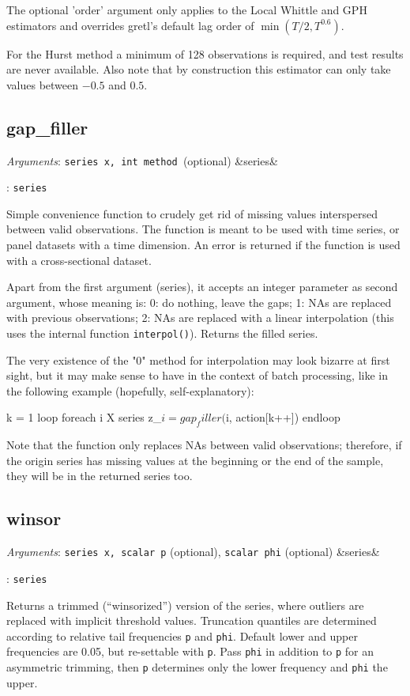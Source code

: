 \documentclass[11pt,english]{article}
\newcommand{\ArgRet}[2]{%
  {\it Arguments}: {#1}%
  \ifx&#2&%
  \else
  \par\smallskip\noindent {\it Return type}: \texttt{#2}
  \fi%
  \par\medskip\par%
  }
\begin{document}
The optional 'order' argument only applies to the Local Whittle and GPH
estimators and overrides gretl's default lag order of $\min(T/2, T^{0.6})$.

For the Hurst method a minimum of 128 observations is required, and test
results are never available. Also note that by construction this estimator can
only take values between $-0.5$ and $0.5$.

\subsection{gap\_filler}

\ArgRet{\texttt{series x, int method }(optional)}{series}

Simple convenience function to crudely get rid of missing values
interspersed between valid observations. The function is meant to be
used with time series, or panel datasets with a time dimension. An
error is returned if the function is used with a cross-sectional
dataset.

Apart from the first argument (series), it accepts an integer
parameter as second argument, whose meaning is: 0: do nothing, leave
the gaps; 1: NAs are replaced with previous observations; 2: NAs are
replaced with a linear interpolation (this uses the internal function
\texttt{interpol()}). Returns the filled series.

The very existence of the "0" method for interpolation may look
bizarre at first sight, but it may make sense to have in the context
of batch processing, like in the following example (hopefully,
self-explanatory):
\begin{code}
k = 1
loop foreach i X
   series z_$i = gap_filler($i, action[k++])
endloop
\end{code}

Note that the function only replaces NAs between valid observations;
therefore, if the origin series has missing values at the beginning or
the end of the sample, they will be in the returned series too.


\subsection{winsor}

\ArgRet{\texttt{series x, scalar p} (optional), \texttt{scalar
phi} (optional)}{series}

Returns a trimmed (``winsorized'') version
of the series, where outliers are replaced with implicit threshold
values. Truncation quantiles are determined according to relative
tail frequencies \texttt{p} and \texttt{phi}. Default lower and upper
frequencies are 0.05, but re-settable with \texttt{p}. Pass \texttt{phi}
in addition to \texttt{p} for an asymmetric trimming, then \texttt{p}
determines only the lower frequency and \texttt{phi} the upper.
\end{document}
